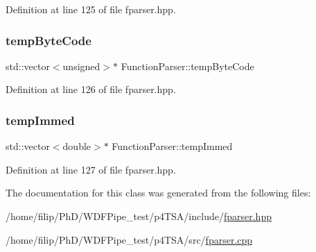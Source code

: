Definition at line 125 of file fparser.\+hpp.

\mbox{\label{class_function_parser_a78e461023408c6074247df656f93bbae}} 
\subsubsection{\texorpdfstring{temp\+Byte\+Code}{tempByteCode}}
{\footnotesize\ttfamily std\+::vector$<$unsigned$>$$\ast$ Function\+Parser\+::temp\+Byte\+Code\hspace{0.3cm}{\ttfamily [private]}}



Definition at line 126 of file fparser.\+hpp.

\mbox{\label{class_function_parser_a9e6c21543859ee17e917a292a16c495a}} 
\subsubsection{\texorpdfstring{temp\+Immed}{tempImmed}}
{\footnotesize\ttfamily std\+::vector$<$double$>$$\ast$ Function\+Parser\+::temp\+Immed\hspace{0.3cm}{\ttfamily [private]}}



Definition at line 127 of file fparser.\+hpp.



The documentation for this class was generated from the following files\+:\begin{DoxyCompactItemize}
\item 
/home/filip/\+Ph\+D/\+W\+D\+F\+Pipe\+\_\+test/p4\+T\+S\+A/include/\hyperlink{fparser_8hpp}{fparser.\+hpp}\item 
/home/filip/\+Ph\+D/\+W\+D\+F\+Pipe\+\_\+test/p4\+T\+S\+A/src/\hyperlink{fparser_8cpp}{fparser.\+cpp}\end{DoxyCompactItemize}
